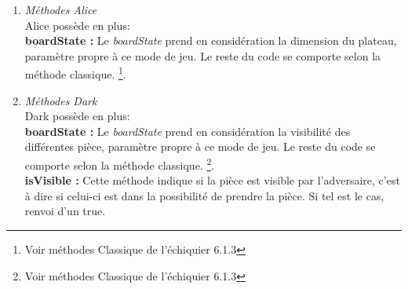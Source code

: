 \documentclass[10pt, a4paper]{article}
\begin{document}
\begin{enumerate}
\item \textit{Méthodes Alice} \\
Alice possède en plus:\\
\textbf{boardState :} Le \textit{boardState} prend en considération la dimension du plateau, paramètre propre à ce mode de jeu. Le reste du code se comporte selon la méthode classique. \footnote{Voir méthodes Classique de l'échiquier 6.1.3}. 

\item \textit{Méthodes Dark} \\
Dark possède en plus:\\
\textbf{boardState :}  Le \textit{boardState} prend en considération la visibilité des différentes pièce, paramètre propre à ce mode de jeu. Le reste du code se comporte selon la méthode classique. \footnote{Voir méthodes Classique de l'échiquier 6.1.3}. \\
\textbf{isVisible :} Cette méthode indique si la pièce est visible par l'adversaire, c'est à dire si celui-ci est dans la possibilité de prendre la pièce. Si tel est le cas, renvoi d'un true.
\end{enumerate}
\end{document}

